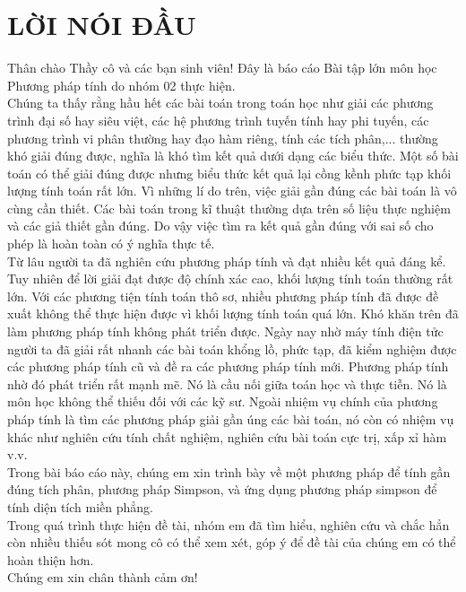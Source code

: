 \documentclass[14pt,a4paper]{article}
\begin{document}
\section*{LỜI NÓI ĐẦU}
\fontsize{13pt}{2pt}\selectfont Thân chào Thầy cô và các bạn sinh viên! Đây là báo cáo Bài tập lớn môn học Phương pháp tính do nhóm 02 thực hiện.\\
\hspace*{1cm}\fontsize{13pt}{2pt}\selectfont Chúng ta thấy rằng hầu hết các bài toán trong toán học như giải các phương trình đại số hay siêu việt, các hệ phương trình tuyến tính hay phi tuyến, các phương trình vi phân thường hay đạo hàm riêng, tính các tích phân,... thường khó giải đúng được, nghĩa là khó tìm kết quả dưới dạng các biểu thức. Một số bài toán có thể giải đúng được nhưng biểu thức kết quả lại cồng kềnh phức tạp khối lượng tính toán rất lớn. Vì những lí do trên, việc giải gần đúng các bài toán là vô cùng cần thiết. Các bài toán trong kĩ thuật thường dựa trên số liệu thực nghiệm và các giả thiết gần đúng. Do vậy việc tìm ra kết quả gần đúng với sai số cho phép là hoàn toàn có ý nghĩa thực tế.\\
\hspace*{1cm}\fontsize{13pt}{2pt}\selectfont Từ lâu người ta đã nghiên cứu phương pháp tính và đạt nhiều kết quả đáng kể. Tuy nhiên để lời giải đạt được độ chính xác cao, khối lượng tính toán thường rất lớn. Với các phương tiện tính toán thô sơ, nhiều phương pháp tính đã được đề xuất không thể thực hiện được vì khối lượng tính toán quá lớn. Khó khăn trên đã làm phương pháp tính không phát triển được. Ngày nay nhờ máy tính điện tửc người ta đã giải rất nhanh các bài toán khổng lồ, phức tạp, đã kiểm nghiệm được các phương pháp tính cũ và đề ra các phương pháp tính mới. Phương pháp tính nhờ đó phát triển rất mạnh mẽ. Nó là cầu nối giữa toán học và thực tiễn. Nó là môn học không thể thiếu đối với các kỹ sư. Ngoài nhiệm vụ chính của phương pháp tính là tìm các phương pháp giải gần úng các bài toán, nó còn có nhiệm vụ khác như nghiên cứu tính chất nghiệm, nghiên cứu bài toán cực trị, xấp xỉ hàm v.v.\\
\hspace*{1cm}\fontsize{13pt}{2pt}\selectfont Trong bài báo cáo này, chúng em xin trình bày về một phương pháp để tính gần đúng tích phân, phương pháp Simpson, và ứng dụng phương pháp simpson để tính diện tích miền phẳng.\\
\hspace*{1cm}\fontsize{13pt}{2pt}\selectfont Trong quá trình thực hiện đề tài, nhóm em đã tìm hiểu, nghiên cứu và chắc hẳn còn nhiều thiếu sót mong cô có thể xem xét, góp ý để đề tài của chúng em có thể hoàn thiện hơn.\\
\hspace*{1cm}\fontsize{13pt}{2pt}\selectfont Chúng em xin chân thành cảm ơn!
\cleardoublepage
{}
\tableofcontents
\thispagestyle{empty}
\cleardoublepage
\listoffigures
{}
\cleardoublepage
\end{document}
